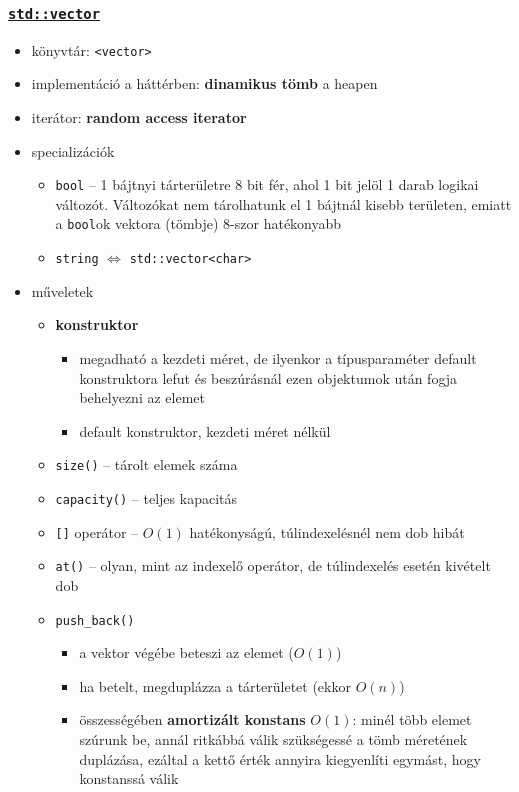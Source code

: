 \documentclass[a4paper, 11pt, oneside]{book}
\begin{document}
\subsubsection{\underline{\texttt{std::vector}}}

\begin{itemize}
	\item könyvtár: \verb*|<vector>|
	\item implementáció a háttérben: \textbf{dinamikus tömb} a heapen
	\item iterátor: \textbf{random access iterator}
	\item specializációk
	\begin{itemize}
		\item \texttt{bool} -- 1 bájtnyi tárterületre 8 bit fér, ahol 1 bit jelöl 1 darab logikai változót. Változókat nem tárolhatunk el 1 bájtnál kisebb területen, emiatt a \verb*|bool|ok vektora (tömbje) 8-szor hatékonyabb
		\item \texttt{string} $\Longleftrightarrow$ \texttt{std::vector<char>}
	\end{itemize}
	\item műveletek
	\begin{itemize}
		\item \textbf{konstruktor}
		\begin{itemize}
			\item megadható a kezdeti méret, de ilyenkor a típusparaméter default konstruktora lefut és beszúrásnál ezen objektumok után fogja behelyezni az elemet
			\item default konstruktor, kezdeti méret nélkül
		\end{itemize}
		\item \texttt{size()} -- tárolt elemek száma
		\item \texttt{capacity()} -- teljes kapacitás
		\item \texttt{[]} operátor -- $O(1)$ hatékonyságú, túlindexelésnél nem dob hibát
		\item \texttt{at()} -- olyan, mint az indexelő operátor, de túlindexelés esetén kivételt dob
		\item \verb*|push_back()|
		\begin{itemize}
			\item a vektor végébe beteszi az elemet ($O(1)$)
			\item ha betelt, megduplázza a tárterületet (ekkor $O(n)$)
			\item összességében \textbf{amortizált konstans} $O(1)$: minél több elemet szúrunk be, annál ritkábbá válik szükségessé a tömb méretének duplázása, ezáltal a kettő érték annyira kiegyenlíti egymást, hogy konstanssá válik

\end{itemize}
\end{itemize}
\end{itemize}
\end{document}
